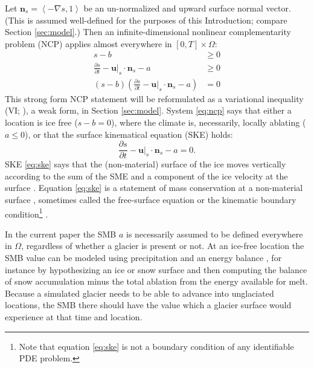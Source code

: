 \documentclass[hidelinks,onefignum,onetabnum,final]{siamart220329}  %
\newcommand{\grad}{\nabla}
\newcommand{\bn}{\mathbf{n}}
\newcommand{\bu}{\mathbf{u}}
\begin{document}
Let $\bn_s = \left<-\grad s,1\right>$ be an un-normalized and upward surface normal vector.  (This is assumed well-defined for the purposes of this Introduction; compare Section \ref{sec:model}.)  Then an infinite-dimensional nonlinear complementarity problem (NCP) \cite{Bueler2021conservation,FacchineiPang2003,SchoofHewitt2013} applies almost everywhere in $[0,T]\times \Omega$:
\begin{subequations}
\label{eq:ncp}
\begin{align}
s - b &\ge 0 \\
\frac{\partial s}{\partial t} - \bu|_s \cdot \bn_s - a &\ge 0 \\
(s - b) \left(\frac{\partial s}{\partial t} - \bu|_s \cdot \bn_s - a\right) &= 0
\end{align}
\end{subequations}
This strong form NCP statement will be reformulated as a variational inequality (VI; \cite{KinderlehrerStampacchia1980}), a weak form, in Section \ref{sec:model}.  System \eqref{eq:ncp} says that either a location is ice free ($s-b=0$), where the climate is, necessarily, locally ablating ($a\le 0$), or that the surface kinematical equation (SKE) holds:
\begin{equation}
\frac{\partial s}{\partial t} - \bu|_s \cdot \bn_s - a = 0.  \label{eq:ske}
\end{equation}
SKE \eqref{eq:ske} says that the (non-material) surface of the ice moves vertically according to the sum of the SME and a component of the ice velocity at the surface \cite{SchoofHewitt2013}.  Equation \eqref{eq:ske} is a statement of mass conservation at a non-material surface \cite{Aschwandenetal2012}, sometimes called the free-surface equation \cite{LofgrenAhlkronaHelanow2022} or the kinematic boundary condition\footnote{Note that equation \eqref{eq:ske} is not a boundary condition of any identifiable PDE problem.} \cite{GreveBlatter2009}.

In the current paper the SMB $a$ is necessarily assumed to be defined everywhere in $\Omega$, regardless of whether a glacier is present or not.  At an ice-free location the SMB value can be modeled using precipitation and an energy balance \cite{GreveBlatter2009}, for instance by hypothesizing an ice or snow surface and then computing the balance of snow accumulation minus the total ablation from the energy available for melt.  Because a simulated glacier needs to be able to advance into unglaciated locations, the SMB there should have the value which a glacier surface would experience at that time and location.
\end{document}
